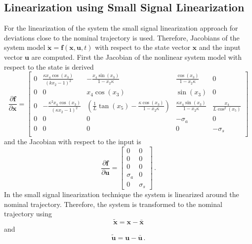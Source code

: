 \subsection{Linearization using Small Signal Linearization}
For the linearization of the system the small signal linearization approach for deviations close to the nominal trajectory is used.
Therefore, Jacobians of the system model $\mathbf{\dot{x}} = \mathbf{f}(\mathbf{x}, \mathbf{u}, t)$ with respect to the state vector $\mathbf{x}$ and the input vector $\mathbf{u}$ are computed.
First the Jacobian of the nonlinear system model with respect to the state is derived
\begin{equation}
	\frac{\partial \mathbf{f}}{\partial \mathbf{x}} = \begin{bmatrix}
		0 & \frac{\kappa x_4 \cos(x_3)}{(kx_2 - 1)^2} & -\frac{x_4 \sin (x_3)}{1 - x_2 \kappa} & \frac{\cos (x_3)}{1 - x_2 \kappa} & 0\\
		0 & 0 & x_4 \cos(x_3) & \sin(x_3) & 0\\
		0 & -\frac{\kappa^2 x_4 \cos(x_3)}{(\kappa x_2 - 1)^2} & \left(\frac{1}{L}\tan(x_5) - \frac{\kappa \cos (x_3)}{1 - x_2 \kappa}\right) & \frac{\kappa x_4 \sin(x_3)}{1 - x_2 \kappa} & \frac{x_4}{L \cos^2(x_5)}\\
		0 & 0 & 0 & -\sigma_a & 0\\
		0 & 0 & 0 & 0& -\sigma_s\\
	\end{bmatrix}
\end{equation}
and the Jacobian with respect to the input is
\begin{equation}
	\frac{\partial \mathbf{f}}{\partial \mathbf{u}} = \begin{bmatrix}
		0 & 0\\
		0 & 0\\
		0 & 0\\
		\sigma_a & 0\\
		0 & \sigma_s
	\end{bmatrix}\, .
\end{equation}
In the small signal linearization technique the system is linearized around the nominal trajectory.
Therefore, the system is transformed to the nominal trajectory using
\begin{equation}
	\boldsymbol{\tilde{x}} = \mathbf{x} - \boldsymbol{\bar{x}}
\end{equation}
and
\begin{equation}
	\boldsymbol{\tilde{u}} = \mathbf{u} - \boldsymbol{\bar{u}} \, .
\end{equation}

